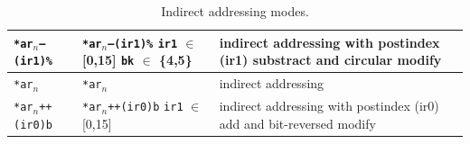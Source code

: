 \begin{table}[!p]
\begin{center}
\begin{tabular}{|p{2.3cm}|p{2.3cm}|p{11.0cm}|}
	\hline
	\texttt{*ar$_n$--(ir1)\%} & \texttt{*ar$_n$--(ir1)\%} \newline \texttt{ir1} $\in$ [0,15] \newline \texttt{bk} $\in$ \{4,5\} & indirect addressing with postindex (ir1) substract and circular modify\\
	\hline
	\texttt{*ar$_n$} & \texttt{*ar$_n$} & indirect addressing\\
	\hline
	\texttt{*ar$_n$++(ir0)b} & \texttt{*ar$_n$++(ir0)b} \newline \texttt{ir1} $\in$ [0,15] & indirect addressing with postindex (ir0) add and bit-reversed modify\\
	\hline
	\end{tabular}
	\caption{\label{table:tms320c3x_indir_addressing_modes} Indirect addressing modes.}
\end{center}
\end{table}

\FloatBarrier

